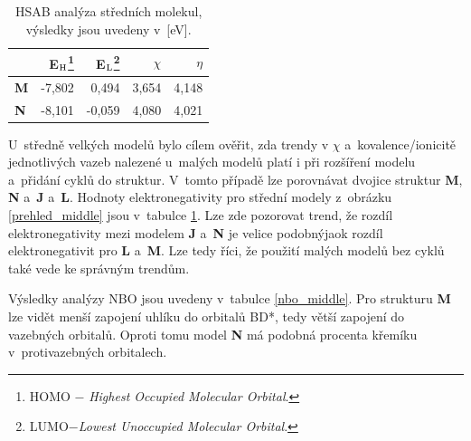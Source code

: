 \documentclass[
digital, %
table,   %
lof,     %
lot,     %
oneside,
]{fithesis3}
\begin{document}
\begin{table}[H]
\begin{minipage}{\textwidth}
\caption{HSAB analýza středních molekul, výsledky jsou uvedeny v~[eV].}
\begin{center}
\begin{tabular}{|l|r|r|r|r|}
\hline
\label{hsab_middle}& E$_{\ce{H}}$\footnote{HOMO $-$ \textit{Highest Occupied Molecular Orbital}.}  & E$_{\ce{L}}$\footnote{LUMO$ - $\textit{Lowest Unoccupied Molecular Orbital}.} & $\chi$  & $\eta$ \\ \hline
\textbf{M} & -7,802 & 0,494 & 3,654 & 4,148 \\ \hline
\textbf{N} & -8,101 & -0,059 & 4,080 & 4,021 \\ \hline
\end{tabular}
\end{center}
\end{minipage}
\end{table}

U~středně velkých modelů bylo cílem ověřit, zda trendy v $\chi$ a~kovalence/ionicitě jednotlivých vazeb nalezené u~malých modelů platí i při rozšíření modelu a~přidání cyklů do struktur. V~tomto případě lze porovnávat dvojice struktur \textbf{M}, \textbf{N} a~\textbf{J} a~\textbf{L}. Hodnoty elektronegativity pro střední modely z~obrázku \ref{prehled_middle} jsou v~tabulce \ref{hsab_middle}. Lze zde pozorovat trend, že rozdíl elektronegativity mezi modelem \textbf{J} a~\textbf{N} je velice podobnýjaok rozdíl elektronegativit pro \textbf{L} a~\textbf{M}. Lze tedy říci, že použití malých modelů bez cyklů také vede ke správným trendům.

Výsledky analýzy NBO jsou uvedeny v~tabulce \ref{nbo_middle}. Pro strukturu \textbf{M} lze vidět menší zapojení uhlíku do orbitalů BD*, tedy větší zapojení do vazebných orbitalů. Oproti tomu model \textbf{N} má podobná procenta křemíku v~protivazebných orbitalech.
\end{document}
